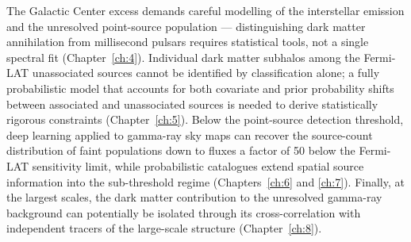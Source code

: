 The Galactic Center excess demands careful modelling of the interstellar emission and the unresolved point-source population --- distinguishing dark matter annihilation from millisecond pulsars requires statistical tools, not a single spectral fit (Chapter~\ref{ch:4}).
Individual dark matter subhalos among the Fermi-LAT unassociated sources cannot be identified by classification alone; a fully probabilistic model that accounts for both covariate and prior probability shifts between associated and unassociated sources is needed to derive statistically rigorous constraints (Chapter~\ref{ch:5}).
Below the point-source detection threshold, deep learning applied to gamma-ray sky maps can recover the source-count distribution of faint populations down to fluxes a factor of 50 below the Fermi-LAT sensitivity limit, while probabilistic catalogues extend spatial source information into the sub-threshold regime (Chapters~\ref{ch:6} and \ref{ch:7}).
Finally, at the largest scales, the dark matter contribution to the unresolved gamma-ray background can potentially be isolated through its cross-correlation with independent tracers of the large-scale structure (Chapter~\ref{ch:8}).


